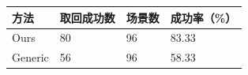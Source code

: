 \begin{tabular}{llll}
\toprule
方法 & 取回成功数 & 场景数 & 成功率（\%） \\
\midrule
Ours & 80 & 96 & 83.33 \\
Generic & 56 & 96 & 58.33 \\
\bottomrule
\end{tabular}
